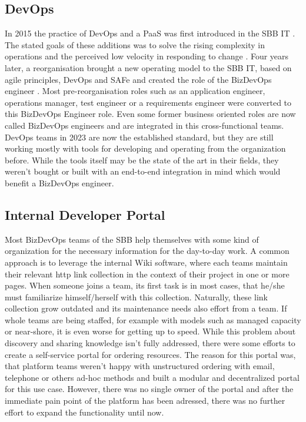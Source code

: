 \documentclass[a4paper,12pt]{article}
\begin{document}
    \subsection{DevOps}
    \label{subsec:sbbdevops}
    In 2015 the practice of DevOps and a PaaS was first introduced in the SBB IT .
    The stated goals of these additions was to solve the rising complexity in operations and the perceived low velocity
    in responding to change\parencite{sbbdevops} .
    Four years later, a reorganisation brought a new operating model to the SBB IT, based on agile principles, DevOps and SAFe
    and created the role of the BizDevOps engineer\parencite{sbbagile} .
    Most pre-reorganisation roles such as an application engineer, operations manager, test engineer or a requirements engineer
    were converted to this BizDevOps Engineer role.
    Even some former business oriented roles are now called BizDevOps engineers and are integrated in this cross-functional
    teams.
    DevOps teams in 2023 are now the established standard, but they are still working mostly with tools for developing and
    operating from the organization before.
    While the tools itself may be the state of the art in their fields, they weren't bought or built with an end-to-end
    integration in mind which would benefit a BizDevOps engineer.

    \subsection{Internal Developer Portal}
    \label{subsec:sbbportal}
    Most BizDevOps teams of the SBB help themselves with some kind of organization for the necessary information
    for the day-to-day work.
    A common approach is to leverage the internal Wiki software, where each teams maintain their relevant http link
    collection in the context of their project in one or more pages.
    When someone joins a team, its first task is in most cases, that he/she must familiarize himself/herself with this
    collection.
    Naturally, these link collection grow outdated and its maintenance needs also effort from a team.
    If whole teams are being staffed, for example with models such as managed capacity or near-shore, it is even worse
    for getting up to speed.
    While this problem about discovery and sharing knowledge isn't fully addressed, there were some efforts to create
    a self-service portal for ordering resources.
    The reason for this portal was, that platform teams weren't happy with unstructured ordering with email, telephone or
    others ad-hoc methods and built a modular and decentralized portal for this use case.
    However, there was no single owner of the portal and after the immediate pain point of the platform has been adressed,
    there was no further effort to expand the functionality until now.
\end{document}
